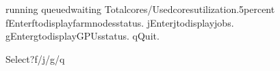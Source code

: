 \documentclass[a4paper,10pt,english]{sphinxmanual}
\begin{document}
\begin{sphinxVerbatim}[commandchars=\\\{\}]
running
queuedwaiting
Totalcores/Usedcoresutilization.5percent
\PYGZhy{}\PYGZhy{}\PYGZhy{}\PYGZhy{}\PYGZhy{}\PYGZhy{}\PYGZhy{}\PYGZhy{}\PYGZhy{}\PYGZhy{}\PYGZhy{}\PYGZhy{}\PYGZhy{}\PYGZhy{}\PYGZhy{}\PYGZhy{}\PYGZhy{}\PYGZhy{}\PYGZhy{}\PYGZhy{}\PYGZhy{}\PYGZhy{}\PYGZhy{}\PYGZhy{}\PYGZhy{}\PYGZhy{}\PYGZhy{}\PYGZhy{}\PYGZhy{}\PYGZhy{}\PYGZhy{}\PYGZhy{}\PYGZhy{}\PYGZhy{}\PYGZhy{}\PYGZhy{}\PYGZhy{}\PYGZhy{}\PYGZhy{}\PYGZhy{}\PYGZhy{}\PYGZhy{}\PYGZhy{}\PYGZhy{}\PYGZhy{}\PYGZhy{}\PYGZhy{}\PYGZhy{}\PYGZhy{}\PYGZhy{}\PYGZhy{}\PYGZhy{}\PYGZhy{}\PYGZhy{}\PYGZhy{}\PYGZhy{}\PYGZhy{}\PYGZhy{}\PYGZhy{}\PYGZhy{}\PYGZhy{}\PYGZhy{}\PYGZhy{}\PYGZhy{}\PYGZhy{}\PYGZhy{}\PYGZhy{}\PYGZhy{}\PYGZhy{}\PYGZhy{}\PYGZhy{}\PYGZhy{}\PYGZhy{}\PYGZhy{}\PYGZhy{}\PYGZhy{}\PYGZhy{}\PYGZhy{}\PYGZhy{}\PYGZhy{}\PYGZhy{}\PYGZhy{}\PYGZhy{}\PYGZhy{}\PYGZhy{}\PYGZhy{}\PYGZhy{}\PYGZhy{}\PYGZhy{}\PYGZhy{}\PYGZhy{}\PYGZhy{}\PYGZhy{}\PYGZhy{}\PYGZhy{}\PYGZhy{}\PYGZhy{}\PYGZhy{}\PYGZhy{}\PYGZhy{}\PYGZhy{}\PYGZhy{}\PYGZhy{}\PYGZhy{}\PYGZhy{}\PYGZhy{}\PYGZhy{}\PYGZhy{}\PYGZhy{}\PYGZhy{}\PYGZhy{}\PYGZhy{}\PYGZhy{}\PYGZhy{}\PYGZhy{}\PYGZhy{}\PYGZhy{}\PYGZhy{}\PYGZhy{}\PYGZhy{}
fEnterftodisplayfarmnodesstatus.
jEnterjtodisplayjobs.
gEntergtodisplayGPUsstatus.
qQuit.

Select?f/j/g/q\PYGZus{}\PYGZus{}


\end{sphinxVerbatim}
\end{document}

